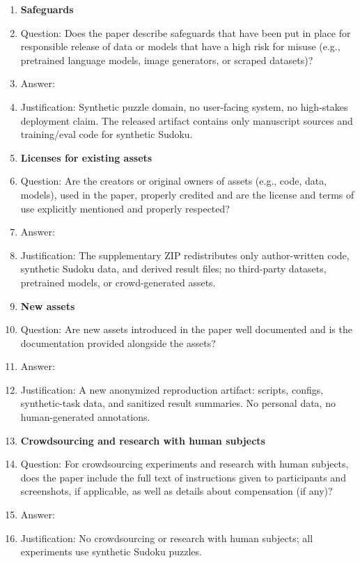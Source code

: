 \documentclass{article}
\theoremstyle{plain}
\theoremstyle{definition}
\theoremstyle{remark}
\begin{document}
\begin{enumerate}[leftmargin=*,itemsep=0.35em,topsep=0.35em]
\item {\bf Safeguards}
    \item[] Question: Does the paper describe safeguards that have been put in place for responsible release of data or models that have a high risk for misuse (e.g., pretrained language models, image generators, or scraped datasets)?
    \item[] Answer: \answerNA{}
    \item[] Justification: Synthetic puzzle domain, no user-facing system, no high-stakes deployment claim. The released artifact contains only manuscript sources and training/eval code for synthetic Sudoku.

\item {\bf Licenses for existing assets}
    \item[] Question: Are the creators or original owners of assets (e.g., code, data, models), used in the paper, properly credited and are the license and terms of use explicitly mentioned and properly respected?
    \item[] Answer: \answerNA{}
    \item[] Justification: The supplementary ZIP redistributes only author-written code, synthetic Sudoku data, and derived result files; no third-party datasets, pretrained models, or crowd-generated assets.

\item {\bf New assets}
    \item[] Question: Are new assets introduced in the paper well documented and is the documentation provided alongside the assets?
    \item[] Answer: \answerYes{}
    \item[] Justification: A new anonymized reproduction artifact: scripts, configs, synthetic-task data, and sanitized result summaries. No personal data, no human-generated annotations.

\item {\bf Crowdsourcing and research with human subjects}
    \item[] Question: For crowdsourcing experiments and research with human subjects, does the paper include the full text of instructions given to participants and screenshots, if applicable, as well as details about compensation (if any)?
    \item[] Answer: \answerNA{}
    \item[] Justification: No crowdsourcing or research with human subjects; all experiments use synthetic Sudoku puzzles.


\end{enumerate}
\end{document}
